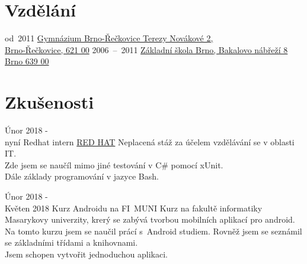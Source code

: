 \documentclass[letterpaper]{twentysecondcv} %
\begin{document}
\makeprofile %

\section{Vzdělání}

\begin{twenty} %
	\twentyitem
    	{od~2011}
        {}
        {}
        {\href{https://www.gyrec.cz/}{Gymnázium Brno-Řečkovice Terezy Novákové 2,\\ Brno-Řečkovice, 621 00}}
        {}
	\twentyitem
    	{2006~--~2011}
        {}
        {}
        {\href{https://www.bakalka.cz/}{Základní škola Brno, Bakalovo nábřeží 8 Brno 639 00}}
        {}
\end{twenty}




\section{Zkušenosti}

\begin{twenty} %
	\twentyitem
    	{Únor 2018 -\\ nyní}
        {Redhat intern}
        {\href{https://www.redhat.com/en/global/czech-republic}{RED HAT}}
        {}
        {
        {
       Neplacená stáž za účelem vzdělávání se v oblasti IT. \\
       Zde jsem se naučíl mimo jiné testování v C\# pomocí xUnit.\\
       Dále základy programování v jazyce Bash.
        }
    	}
        
	\twentyitem
    	{Únor 2018 -\\ Květen 2018}
        {Kurz Androidu na FI~MUNI}
        {}
        {}
        {
        {
       Kurz na fakultě informatiky Masarykovy univerzity, krerý se zabývá tvorbou mobilních aplikací pro android. \\
	Na tomto kurzu jsem se naučil prácí s~Android studiem. Rovněž jsem se seznámil se základními třídami a knihovnami.\\
	Jsem schopen vytvořit jednoduchou aplikaci.
        }
    	}
\end{twenty}
\end{document}
